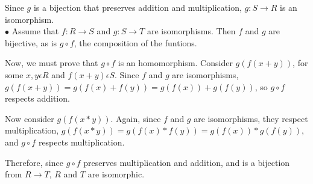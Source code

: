 \documentclass[a4paper,11pt]{article}
\begin{document}
Since $g$ is a bijection that preserves addition and multiplication, $g: S \rightarrow R$ is an isomorphism.\\

$\bullet$ Assume that $f: R \rightarrow S$ and $g: S \rightarrow T$ are isomorphisms. Then $f$ and $g$ are bijective, as is $g \circ f$, the composition of the funtions.

Now, we must prove that $g\circ f$ is an homomorphism. Consider $g(f(x+y))$, for some $x,y\epsilon R$ and $f(x+y)\epsilon S$. Since $f$ and $g$ are isomorphisms, $g(f(x+y)) = g(f(x)+f(y)) = g(f(x)) + g(f(y))$, so $g\circ f$ respects addition. 

Now consider $g(f(x*y))$. Again, since $f$ and $g$ are isomorphisms, they respect multiplication, $g(f(x*y)) = g(f(x)*f(y)) = g(f(x)) * g(f(y))$, and $g\circ f$ respects multiplication.

Therefore, since $g \circ f$ preserves multiplication and addition, and is a bijection from $R \rightarrow T$, $R$ and $T$ are isomorphic.
\end{document}
